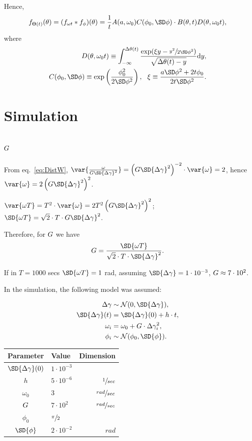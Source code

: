 \documentclass{article}
\newcommand{\Norm}{\mathcal{N}}
\begin{document}
Hence, 
\begin{align*}
	\ftht(\theta) = (\fwt*\fp)(\theta) = \frac1t\A\C\cdot\B\CDF,
\end{align*}
where 
\begin{align}
		\CDF \equiv \CDF*, \\ \C \equiv \C*, ~~ \X \equiv \X*.
\end{align}

\section{Simulation}
\newcommand{\ytcoef}{h}
\newcommand{\dwcoef}{g}
\newcommand{\vp}[2]{{#1}\cdot 10^{#2} }

\subsection{$G$}
From eq.~\eqref{eq:DistW}, $\var{\frac{\omega}{\wycoef\SD{\dy}^2}} = \bkt{\wycoef\SD{\dy}^2}^{-2}\cdot\var{\omega}  = 2$, hence $\var{\omega} = 2\bkt{\wycoef\SD{\dy}^2}^2$.

$\var{\omega T} = T^2\cdot \var{\omega} = 2T^2\bkt{\wycoef\SD{\dy}^2}^2$; $\SD{\omega T} = \sqrt{2}\cdot T\cdot \wycoef\SD{\dy}^2$.

Therefore, for $G$ we have
\begin{equation}
	\wycoef = \frac{\SD{\omega T}}{\sqrt{2}\cdot T\cdot \SD{\dy}^2}.
\end{equation}

If in $T=1000$ secs $\SD{\omega T} = 1$ rad, assuming $\SD{\dy} = \vp{1}{-3}$, $\wycoef \approx \vp{7}{2}$.

In the simulation, the following model was assumed:\\
\begin{minipage}{.5\textwidth}
	\begin{align*}
		\dy &\sim \Norm(0, \SD{\dy}), \\
		\SD{\dy}(t) &= \SD{\dy}(0) + \ytcoef\cdot t, \\
		\omega_i &= \omega_0 + \wycoef\cdot \dy_i^2, \\
		\phi_i &\sim \Norm(\phi_0, \SD{\phi}).
	\end{align*}
\end{minipage}
\begin{minipage}{.5\textwidth}
	\begin{tabular}{clr}
		  Parameter   & Value            &          Dimension \\ \hline
		$\SD{\dy}(0)$ & $\vp{1}{-3}$     &  \\
		  $\ytcoef$    & $\vp{5}{-6}$     &   $\sfrac{1}{sec}$ \\
		 $\omega_0$   & $3$              & $\sfrac{rad}{sec}$ \\
		  $G$    & $\vp{7}{2}$      & $\sfrac{rad}{sec}$ \\
		  $\phi_0$    & $\sfrac{\pi}{2}$ &  \\
		 $\SD{\phi}$  & $\vp{2}{-2}$     &              $rad$ \\ \hline
	\end{tabular}
\end{minipage}
\end{document}
